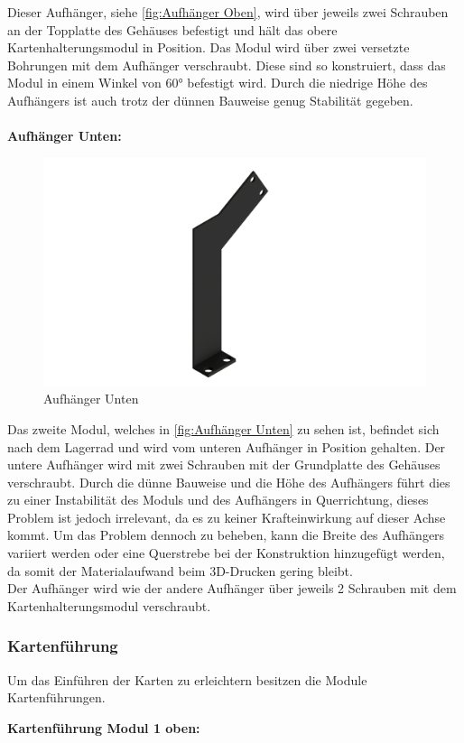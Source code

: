 Dieser Aufhänger, siehe \autoref{fig:Aufhänger Oben}, wird über jeweils zwei Schrauben an der Topplatte des Gehäuses befestigt und hält das obere Kartenhalterungsmodul in Position.
Das Modul wird über zwei versetzte Bohrungen mit dem Aufhänger verschraubt.
Diese sind so konstruiert, dass das Modul in einem Winkel von 60° befestigt wird.
Durch die niedrige Höhe des Aufhängers ist auch trotz der dünnen Bauweise genug Stabilität gegeben.\\\\


\textbf{Aufhänger Unten:}

\begin{figure}
    \includegraphics[width=8 cm]{fig/mech/AufhaengerIUnten}
    \caption{Aufhänger Unten}
    \label{fig:Aufhänger Unten}
\end{figure}

Das zweite Modul, welches in \autoref{fig:Aufhänger Unten} zu sehen ist, befindet sich nach dem Lagerrad und wird vom unteren Aufhänger in Position gehalten.
Der untere Aufhänger wird mit zwei Schrauben mit der Grundplatte des Gehäuses verschraubt.
Durch die dünne Bauweise und die Höhe des Aufhängers führt dies zu einer Instabilität des Moduls und des Aufhängers in Querrichtung, dieses Problem ist jedoch irrelevant, da es
zu keiner Krafteinwirkung auf dieser Achse kommt.
Um das Problem dennoch zu beheben, kann die Breite des Aufhängers variiert werden oder eine Querstrebe bei der Konstruktion hinzugefügt werden, da somit der Materialaufwand beim 3D-Drucken gering bleibt.\\
Der Aufhänger wird wie der andere Aufhänger über jeweils 2 Schrauben mit dem Kartenhalterungsmodul verschraubt.


\subsubsection{Kartenführung}
Um das Einführen der Karten zu erleichtern besitzen die Module Kartenführungen.

\textbf{Kartenführung Modul 1 oben:}

